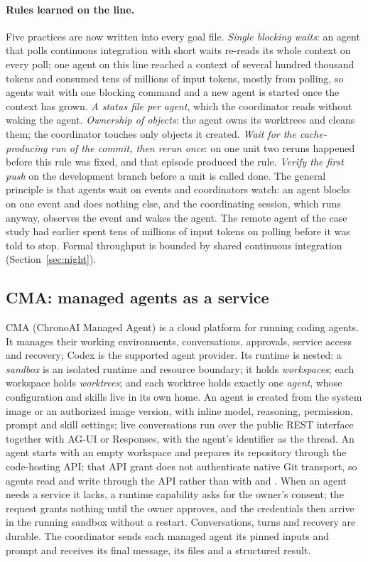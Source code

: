 \documentclass[11pt]{article}
\newcommand{\code}[1]{\texttt{\detokenize{#1}}}
\begin{document}
\paragraph{Rules learned on the line.} Five practices are now written into
every goal file. \emph{Single blocking waits}: an agent that polls
continuous integration with short waits re-reads its whole context on every
poll; one agent on this line reached a context of several hundred thousand
tokens and consumed tens of millions of input tokens, mostly from polling, so
agents wait with one blocking command and a new agent is started once the
context has grown. \emph{A status file per agent}, which the coordinator
reads without waking the agent. \emph{Ownership of objects}: the agent owns
its worktrees and cleans them; the coordinator touches only objects it
created. \emph{Wait for the cache-producing run of the commit, then rerun
once}: on one unit two reruns happened before this rule was fixed, and that
episode produced the rule.
\emph{Verify the first push} on the development branch before a unit is
called done. The general principle is that agents wait on events and
coordinators watch: an agent blocks on one event and does nothing else, and
the coordinating session, which runs anyway, observes the event and wakes the
agent. The remote agent of the case study had earlier spent tens of millions
of input tokens on polling before it was told to stop. Formal throughput is
bounded by shared continuous integration (Section~\ref{sec:night}).

\subsection{CMA: managed agents as a service}
\label{sec:cma}
CMA (ChronoAI Managed Agent) \citep{cma} is a cloud platform for running
coding agents. It manages their working environments, conversations,
approvals, service access and recovery; Codex is the supported agent
provider. Its runtime is nested: a \emph{sandbox} is an isolated runtime and
resource boundary; it holds \emph{workspaces}; each workspace holds
\emph{worktrees}; and each worktree holds exactly one \emph{agent}, whose
configuration and skills live in its own home. An agent is created from the
system image or an authorized image version, with inline model, reasoning,
permission, prompt and skill settings; live conversations run over the
public REST interface together with AG-UI or Responses, with the agent's
identifier as the thread. An agent starts with an empty workspace and
prepares its repository through the code-hosting API; that API grant does
not authenticate native Git transport, so agents read and write through the
API rather than with \code{git pull} and \code{git push}. When an agent
needs a service it lacks, a runtime capability asks for the owner's consent;
the request grants nothing until the owner approves, and the credentials then
arrive in the running sandbox without a restart. Conversations, turns and
recovery are durable. The coordinator sends each managed agent its pinned
inputs and prompt and receives its final message, its files and a structured
result.
\end{document}
